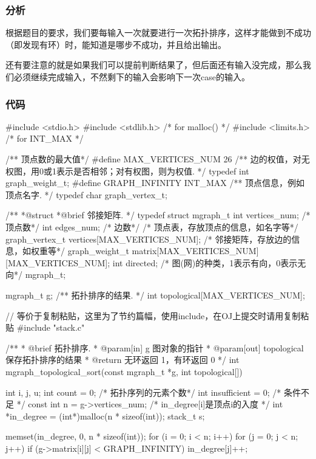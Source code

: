 \subsubsection{分析}
根据题目的要求，我们要每输入一次就要进行一次拓扑排序，这样才能做到不成功（即发现有环）时，能知道是哪步不成功，并且给出输出。

还有要注意的就是如果我们可以提前判断结果了，但后面还有输入没完成，那么我们必须继续完成输入，不然剩下的输入会影响下一次case的输入。

\subsubsection{代码}
\begin{Codex}[label=poj_1094.c]
#include <stdio.h>
#include <stdlib.h>  /* for malloc() */
#include <limits.h>  /* for INT_MAX */

/** 顶点数的最大值*/
#define MAX_VERTICES_NUM 26
/** 边的权值，对无权图，用0或1表示是否相邻；对有权图，则为权值. */
typedef int graph_weight_t;
#define GRAPH_INFINITY INT_MAX
/** 顶点信息，例如顶点名字. */
typedef char graph_vertex_t;

/**
 *@struct
 *@brief 邻接矩阵.
 */
typedef struct mgraph_t {
    int vertices_num; /* 顶点数*/
    int edges_num; /* 边数*/
    /* 顶点表，存放顶点的信息，如名字等*/
    graph_vertex_t vertices[MAX_VERTICES_NUM];
    /* 邻接矩阵，存放边的信息，如权重等*/
    graph_weight_t matrix[MAX_VERTICES_NUM][MAX_VERTICES_NUM];
    int directed; /* 图(网)的种类，1表示有向，0表示无向*/
} mgraph_t;

mgraph_t g;
/** 拓扑排序的结果. */
int topological[MAX_VERTICES_NUM];

// 等价于复制粘贴，这里为了节约篇幅，使用include，在OJ上提交时请用复制粘贴
#include "stack.c"

/**
  * @brief 拓扑排序.
  * @param[in] g 图对象的指针
  * @param[out] topological 保存拓扑排序的结果
  * @return 无环返回 1，有环返回 0
  */
int mgraph_topological_sort(const mgraph_t *g, int topological[]) {
    int i, j, u;
    int count = 0; /* 拓扑序列的元素个数*/
    int insufficient = 0;  /* 条件不足 */
    const int n = g->vertices_num;
    /* in_degree[i]是顶点i的入度 */
    int *in_degree = (int*)malloc(n * sizeof(int));
    stack_t s;

    memset(in_degree, 0, n * sizeof(int));
    for (i = 0; i < n; i++) {
        for (j = 0; j < n; j++) {
            if (g->matrix[i][j] < GRAPH_INFINITY)
                in_degree[j]++;
        }
    }

}
\end{Codex}
